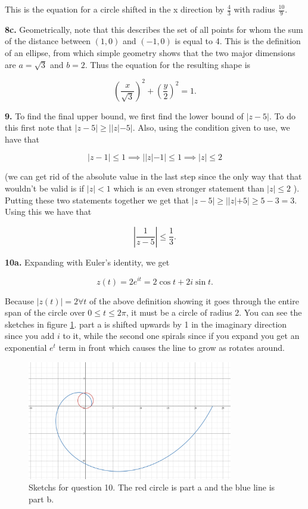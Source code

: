 \documentclass[letterpaper, reqno,11pt]{article}
\begin{document}
This is the equation for a circle shifted in the x direction by $\frac{4}{3}$ with radius $\frac{10}{9}$. 

{\noindent\bf 8c.} Geometrically, note that this describes the set of all points for whom the sum of the distance between $(1, 0)$ and $(-1, 0)$ is equal to 4. This is the definition of an ellipse, from which simple geometry shows that the two major dimensions are $a=\sqrt{3} $ and $b=2$. Thus the equation for the resulting shape is 

 \[
\left( \frac{x}{\sqrt{3} } \right)^2 +\left( \frac{y}{2 } \right)^2 =1
.\] 

{\noindent\bf 9.} To find the final upper bound, we first find the lower bound of $|z-5|$. To do this first note that $|z-5|\geq ||z|-5|$. Also, using the condition given to use, we have that 

 \[
|z-1|\leq 1\implies | |z|-1 |\leq 1\implies |z| \leq 2
\] 

(we can get rid of the absolute value in the last step since the only way that that wouldn't be valid is if $|z|<1$ which is an even stronger statement than $|z|\leq 2$ ). Putting these two statements together we get that $|z-5|\geq ||z|+5|\geq 5-3=3$. Using this we have that 

 \[
\left| \frac{1}{z-5} \right| \leq \frac{1}{3}
.\] 

{\noindent\bf 10a.} Expanding with Euler's identity, we get 

\[
z(t)=2e^{it}=2\cos t+2i\sin t
.\] 

Because $|z(t)|=2\forall t$ of the above definition showing it goes through the entire span of the circle over $0\leq t\leq 2 \pi$, it must be a circle of radius 2. You can see the sketches in figure \ref{fig:q10}. part a is shifted upwards by 1 in the imaginary direction since you add $i$ to it, while the second one spirals since if you expand you get an exponential $e^{t}$ term in front which causes the line to grow as rotates around. 

\begin{figure}[htpb]
    \centering
    \includegraphics[width=0.8\textwidth]{q10}
    \caption{Sketchs for question 10. The red circle is part a and the blue line is part b. }
    \label{fig:q10}
\end{figure}
\end{document}
